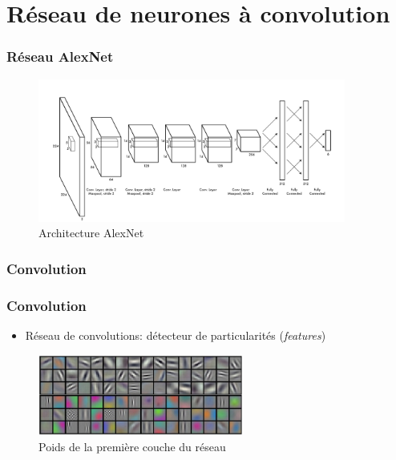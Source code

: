 \documentclass{beamer}
\begin{document}
\section{Réseau de neurones à convolution}
\begin{frame}
  \frametitle{Réseau AlexNet}
  \begin{figure}
    \centering
    \includegraphics[width=0.9\textwidth]{img/alexnet.png}
    \caption{Architecture AlexNet}
    \label{fig:alexnet}
  \end{figure}
\end{frame}

\begin{frame}
  \frametitle{Convolution}
  \begin{center}
  \end{center}
\end{frame}

\begin{frame}
  \frametitle{Convolution}
  \begin{itemize}
  \item Réseau de convolutions: détecteur de particularités (\emph{features})
  \end{itemize}
  \begin{figure}
    \centering
    \includegraphics[width=0.6\textwidth]{img/weights.jpeg}
    \caption{Poids de la première couche du réseau}
    \label{fig:weights}
  \end{figure}
\end{frame}
\end{document}
